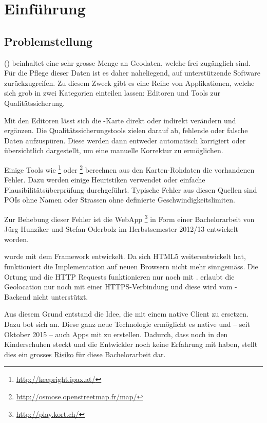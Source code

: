 \chapter{Einführung}
\label{tb-einfuehrung}

\section{Problemstellung}
 () beinhaltet eine sehr grosse Menge an Geodaten, welche frei zugänglich sind.
Für die Pflege dieser Daten ist es daher naheliegend, auf unterstützende Software zurückzugreifen.
Zu diesem Zweck gibt es eine Reihe von Applikationen, welche sich grob in zwei Kategorien einteilen lassen:
Editoren und Tools zur Qualitätssicherung.

Mit den Editoren lässt sich die -Karte direkt oder indirekt verändern und ergänzen.
Die Qualitätssicherungstools zielen darauf ab, fehlende oder falsche Daten aufzuspüren.
Diese werden dann entweder automatisch korrigiert oder übersichtlich dargestellt, um eine manuelle Korrektur zu ermöglichen.

Einige Tools wie \footnote{\url{http://keepright.ipax.at/}} oder \footnote{\url{http://osmose.openstreetmap.fr/map/}} berechnen aus den Karten-Rohdaten die vorhandenen Fehler.
Dazu werden einige Heuristiken verwendet oder einfache Plausibilitätsüberprüfung durchgeführt.
Typische Fehler aus diesen Quellen sind \glspl{POI} ohne Namen oder Strassen ohne definierte Geschwindigkeitslimiten.\cite{ba-kort-2012}

Zur Behebung dieser Fehler ist die \gls{WebApp} \kort{}\footnote{\url{http://play.kort.ch/}} in Form einer Bachelorarbeit von Jürg Hunziker und Stefan Oderbolz im Herbstsemester 2012/13 entwickelt  worden.\cite{ba-kort-2012}

\kort{} wurde mit dem  \gls{Framework} entwickelt.
Da sich HTML5 weiterentwickelt hat, funktioniert die Implementation auf neuen Browsern nicht mehr sinngemäss.
Die Ortung und die HTTP Requests funktionieren nur noch mit .
 erlaubt die Geolocation nur noch mit einer HTTPS-Verbindung und diese wird vom \kort{}-Backend nicht unterstützt.

Aus diesem Grund entstand die Idee, die \kort{} mit einem native Client zu ersetzen.
Dazu bot sich  an. 
Diese ganz neue Technologie ermöglicht es native  und -- seit Oktober 2015 -- auch  Apps mit  zu erstellen. 
Dadurch, dass  noch in den Kinderschuhen steckt und die Entwickler noch keine Erfahrung mit  haben, stellt dies ein grosses \hyperref[pm-projektmanagement-risikomanagement]{Risiko} für diese Bachelorarbeit dar.

